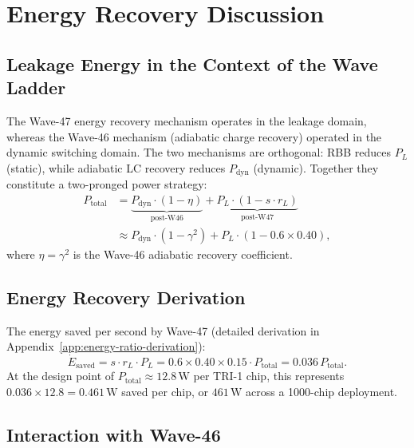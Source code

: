 \section{Energy Recovery Discussion}
\label{sec:energy-recovery-w47}

\subsection{Leakage Energy in the Context of the Wave Ladder}

The Wave-47 energy recovery mechanism operates in the leakage domain, whereas
the Wave-46 mechanism (adiabatic charge recovery) operated in the dynamic
switching domain.
The two mechanisms are orthogonal: RBB reduces $P_L$ (static), while adiabatic
LC recovery reduces $P_{\mathrm{dyn}}$ (dynamic).
Together they constitute a two-pronged power strategy:
\begin{align}
  P_{\mathrm{total}} &= \underbrace{P_{\mathrm{dyn}} \cdot (1 - \eta)}_{\text{post-W46}}
    + \underbrace{P_L \cdot (1 - s \cdot r_L)}_{\text{post-W47}} \nonumber \\
  &\approx P_{\mathrm{dyn}} \cdot (1 - \gamma^{2})
    + P_L \cdot (1 - 0.6 \times 0.40),
\end{align}
where $\eta = \gamma^{2}$ is the Wave-46 adiabatic recovery coefficient.

\subsection{Energy Recovery Derivation}

The energy saved per second by Wave-47 (detailed derivation in
Appendix~\ref{app:energy-ratio-derivation}):
\begin{equation}\label{eq:energy-saved}
  \dot{E}_{\mathrm{saved}} = s \cdot r_L \cdot P_L
    = 0.6 \times 0.40 \times 0.15 \cdot P_{\mathrm{total}}
    = 0.036\,P_{\mathrm{total}}.
\end{equation}
At the design point of $P_{\mathrm{total}} \approx 12.8\,\text{W}$ per
TRI-1 chip, this represents $0.036 \times 12.8 = 0.461\,\text{W}$ saved per
chip, or $461\,\text{W}$ across a 1000-chip deployment.

\subsection{Interaction with Wave-46}

